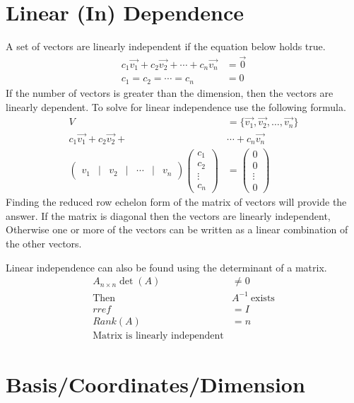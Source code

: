 \documentclass[12pt]{article}
\begin{document}
\section{Linear (In) Dependence}
A set of vectors are linearly independent if the equation below holds true.
\begin{align}
  c_1\vec{v_1} + c_2\vec{v_2} + \cdots + c_n\vec{v_n} &= \vec{0}\\
  c_1=c_2=\cdots=c_n&=0
\end{align}
If the number of vectors is greater than the dimension, then the vectors are linearly dependent. To solve for linear independence use the following formula.
\begin{align}
  V &= \{\vec{v_1}, \vec{v_2}, \ldots, \vec{v_n}\}\\
  c_1\vec{v_1} + c_2\vec{v_2} + &\cdots + c_n\vec{v_n}\\
  \left( \begin{array}{ccccccc}
    v_1 & | & v_2 & | & \cdots & | & v_n
  \end{array}\right)\left(\begin{array}{c}
    c_1 \\ c_2 \\ \vdots \\ c_n
  \end{array}\right) &= \left(\begin{array}{c}
    0 \\ 0 \\ \vdots \\ 0
  \end{array}\right)
\end{align}
Finding the reduced row echelon form of the matrix of vectors will provide the answer. If the matrix is diagonal then the vectors are linearly independent, Otherwise one or more of the vectors can be written as a linear combination of the other vectors.
\par
Linear independence can also be found using the determinant of a matrix.
\begin{align}
  A_{n\times n}
  \det\left(A\right) &\neq 0\\
  \text{Then}\ &A^{-1}\ \text{exists}\\
  rref &= I\\
  Rank\left(A\right) &= n\\
  \text{Matrix is linearly independent}
\end{align}
\section{Basis/Coordinates/Dimension}\label{b}
\end{document}
